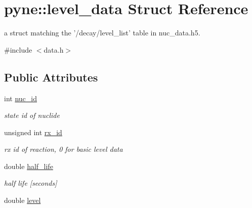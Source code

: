 \hypertarget{structpyne_1_1level__data}{\section{pyne\+:\+:level\+\_\+data Struct Reference}
\label{structpyne_1_1level__data}
}


a struct matching the '/decay/level\+\_\+list' table in nuc\+\_\+data.\+h5.  




{\ttfamily \#include $<$data.\+h$>$}

\subsection*{Public Attributes}
\begin{DoxyCompactItemize}
\item 
\hypertarget{structpyne_1_1level__data_aefac68a7a5aaedafd0b01f459e75adc8}{int \hyperlink{structpyne_1_1level__data_aefac68a7a5aaedafd0b01f459e75adc8}{nuc\+\_\+id}}\label{structpyne_1_1level__data_aefac68a7a5aaedafd0b01f459e75adc8}

\begin{DoxyCompactList}\small\item\em state id of nuclide \end{DoxyCompactList}\item 
\hypertarget{structpyne_1_1level__data_a52a8e7987f8f2a01fe7142bac5ab6adc}{unsigned int \hyperlink{structpyne_1_1level__data_a52a8e7987f8f2a01fe7142bac5ab6adc}{rx\+\_\+id}}\label{structpyne_1_1level__data_a52a8e7987f8f2a01fe7142bac5ab6adc}

\begin{DoxyCompactList}\small\item\em rx id of reaction, 0 for basic level data \end{DoxyCompactList}\item 
\hypertarget{structpyne_1_1level__data_a044daae5c914e096c423b95da1586dc0}{double \hyperlink{structpyne_1_1level__data_a044daae5c914e096c423b95da1586dc0}{half\+\_\+life}}\label{structpyne_1_1level__data_a044daae5c914e096c423b95da1586dc0}

\begin{DoxyCompactList}\small\item\em half life \mbox{[}seconds\mbox{]} \end{DoxyCompactList}\item 
\hypertarget{structpyne_1_1level__data_af029059b5f79cfa2ad22e6f9fcb04ac9}{double \hyperlink{structpyne_1_1level__data_af029059b5f79cfa2ad22e6f9fcb04ac9}{level}}\label{structpyne_1_1level__data_af029059b5f79cfa2ad22e6f9fcb04ac9}


\end{DoxyCompactItemize}
